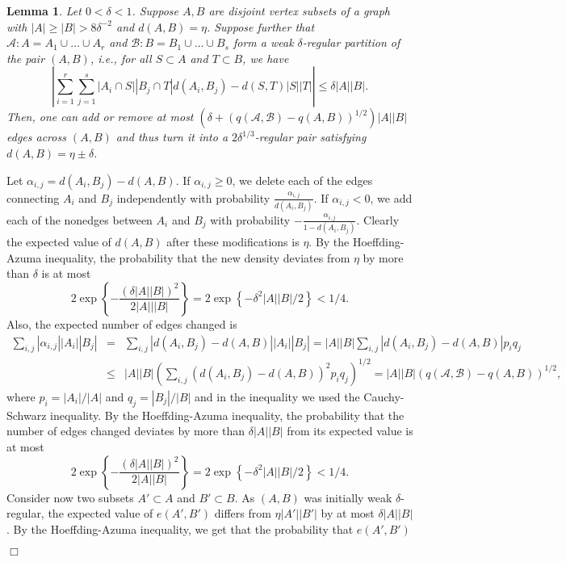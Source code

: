 \documentclass[11pt]{article}
\newtheorem{lemma}{Lemma}[section]
\newenvironment{proof}
      {\medskip\noindent{\bf Proof:}\hspace{1mm}}
      {\hfill$\Box$\medskip}
\begin{document}
\begin{lemma}\label{keyforral} Let $0<\delta<1$. Suppose
$A,B$ are disjoint vertex subsets of a graph with $|A| \geq |B| > 8\delta^{-2}$ and $d(A,B)=\eta$. Suppose further that $\mathcal{A}:A=A_1 \cup \ldots \cup A_r$ and $\mathcal{B}:B=B_1 \cup \ldots \cup B_s$ form a weak $\delta$-regular
partition of the pair $(A,B)$, i.e., for all $S \subset A$ and $T \subset B$,
we have
$$\left|\sum_{i=1}^r \sum_{j=1}^s |A_i \cap S||B_j \cap
T|d(A_i,B_j)-d(S,T)|S||T| \right|\leq \delta |A||B|.$$
Then, one can add or remove at most
$\left(\delta+\left(q(\mathcal{A},\mathcal{B})-q(A,B)\right)^{1/2}\right)|A||B|$
edges across $(A,B)$ and thus turn it into a $2\delta^{1/3}$-regular pair
satisfying $d(A, B) = \eta  \pm \delta$.
\end{lemma}
\begin{proof}
Let $\alpha_{i,j}=d(A_i,B_j)-d(A,B)$. If $\alpha_{i,j}\geq 0$, we delete each
of the edges connecting $A_i$ and $B_j$ independently with probability
$\frac{\alpha_{i,j}}{d(A_i,B_j)}$. If $\alpha_{i,j} <0$, we add each of the
nonedges between $A_i$ and $B_j$ with probability
$-\frac{\alpha_{i,j}}{1-d(A_i,B_j)}$. Clearly the expected value of $d(A,B)$
after these modifications is $\eta$. By the Hoeffding-Azuma inequality, the
probability that the new density deviates from $\eta$ by more than $\delta$ is
at most $$2 \exp\left\{
      -\frac{(\delta |A||B|)^2}{2|A|||B|}
    \right\}=2\exp\left\{-\delta^2|A||B|/2\right\}<1/4.$$ Also, the expected
number of edges changed is
\begin{eqnarray*}\sum_{i,j} |\alpha_{i,j}| |A_i||B_j| & =
&\sum_{i,j}|d(A_i,B_j)-d(A,B)||A_i||B_j| = |A||B| \sum_{i, j} |d(A_i, B_j) - d(A,
B)| p_i q_j\\ & \leq & |A||B|\left(\sum_{i, j} \left(d(A_i, B_j) - d(A,
B)\right)^2 p_i q_j\right)^{1/2} = |A||B| \left(q(\mathcal{A}, \mathcal{B}) - q(A,
B)\right)^{1/2},\end{eqnarray*}
where $p_i = |A_i|/|A|$ and $q_j = |B_j|/|B|$ and in the inequality we used the
Cauchy-Schwarz inequality. By the Hoeffding-Azuma inequality, the probability
that the number of edges changed deviates by more than $\delta |A||B|$ from its
expected value is at most
$$2 \exp\left\{
      -\frac{(\delta |A||B|)^2}{2|A||B|}
    \right\}=2\exp\left\{-\delta^2|A||B|/2\right\}<1/4.$$
Consider now two subsets $A' \subset A$ and $B' \subset B$. As $(A, B)$ was
initially weak $\delta$-regular,
the expected value of $e(A',B')$ differs from $\eta |A'||B'|$ by at most
$\delta |A||B|$.
By the Hoeffding-Azuma inequality, we get that the probability that $e(A',B')$

\end{proof}
\end{document}
